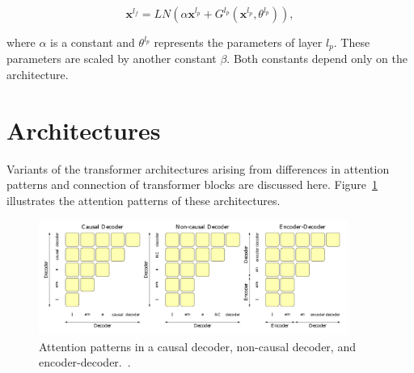 \documentclass[a4paper,oneside]{book}
\begin{document}
\begin{enumerate}
        \begin{equation}
          \mathbf{x}^{l_{f}} = LN\left(\alpha \mathbf{x}^{l_{p}}+G^{l_{p}}\left(\mathbf{x}^{l_{p}}, \theta^{l_{p}}\right)\right),
        \end{equation}

        where $\alpha$ is a constant and $\theta^{l_{p}}$ represents the parameters of layer $l_{p}$. These parameters are scaled by another constant $\beta$. Both constants depend only on the architecture.
\end{enumerate}

\section{Architectures}
Variants of the transformer architectures arising from differences in attention patterns and connection of transformer blocks are discussed here. Figure~\ref{fig:attention_patterns} illustrates the attention patterns of these architectures.

\begin{figure}[!htb]
  \centering
  \includegraphics[width=0.9\textwidth]{img/attention_patterns}
  \caption{Attention patterns in a causal decoder, non-causal decoder, and encoder-decoder.~\cite{wang2022language}.}\label{fig:attention_patterns}
\end{figure}
\end{document}

